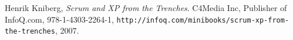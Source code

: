


\begin{thebibliography}{9}

    Henrik Kniberg,
    \emph{Scrum and XP from the Trenches}.
    C4Media Inc, Publisher of InfoQ.com,
    978-1-4303-2264-1,
    \texttt{http://infoq.com/minibooks/scrum-xp-from-the-trenches},
    2007.

\end{thebibliography}
